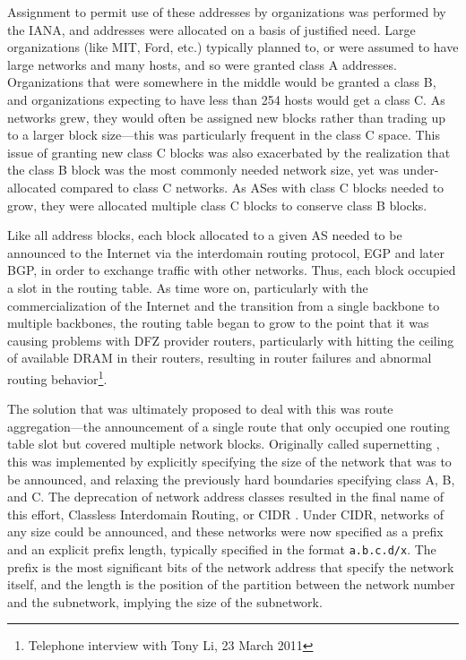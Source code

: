 Assignment to permit use of these addresses by organizations was performed by the IANA, and addresses were allocated on a basis of justified need. Large organizations (like MIT, Ford, etc.) typically planned to, or were assumed to have large networks and many hosts, and so were granted class A addresses. Organizations that were somewhere in the middle would be granted a class B, and organizations expecting to have less than 254 hosts would get a class C. As networks grew, they would often be assigned new blocks rather than trading up to a larger block size---this was particularly frequent in the class C space. This issue of granting new class C blocks was also exacerbated by the realization that the class B block was the most commonly needed network size, yet was under-allocated compared to class C networks. As ASes with class C blocks needed to grow, they were allocated multiple class C blocks to conserve class B blocks.

Like all address blocks, each block allocated to a given AS needed to be announced to the Internet via the interdomain routing protocol, EGP and later BGP, in order to exchange traffic with other networks. Thus, each block occupied a slot in the routing table. As time wore on, particularly with the commercialization of the Internet and the transition from a single backbone to multiple backbones, the routing table began to grow to the point that it was causing problems with DFZ provider routers, particularly with hitting the ceiling of available DRAM in their routers, resulting in router failures and abnormal routing behavior\footnote{Telephone interview with Tony Li, 23 March 2011}.


The solution that was ultimately proposed to deal with this was route aggregation---the announcement of a single route that only occupied one routing table slot but covered multiple network blocks. Originally called supernetting \cite{rfc1338}, this was implemented by explicitly specifying the size of the network that was to be announced, and relaxing the previously hard boundaries specifying class A, B, and C. The deprecation of network address classes resulted in the final name of this effort, Classless Interdomain Routing, or CIDR \cite{rfc1519}. Under CIDR, networks of any size could be announced, and these networks were now specified as a prefix and an explicit prefix length, typically specified in the format \texttt{a.b.c.d/x}. The prefix is the most significant bits of the network address that specify the network itself, and the length is the position of the partition between the network number and the subnetwork, implying the size of the subnetwork.

